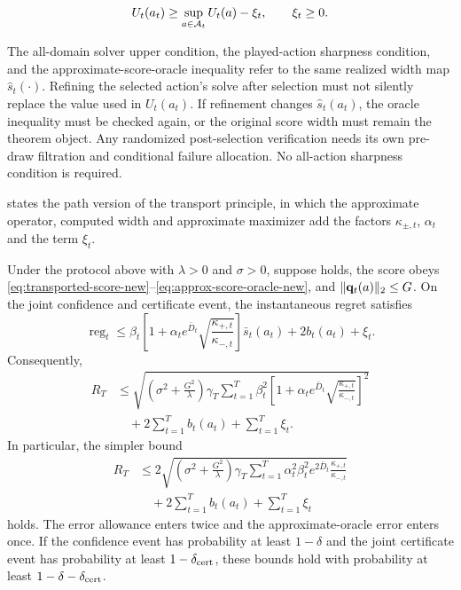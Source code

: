 \begin{equation}\label{eq:approx-score-oracle-new}
 U_t(a_t)\ge\sup_{a\in\mathcal{A}_t}U_t(a)-\xi_t,\qquad \xi_t\ge0.
\end{equation}

\begin{remark}
The all-domain solver upper condition, the played-action sharpness condition,
and the approximate-score-oracle inequality refer to the same realized width
map $\hat s_t(\cdot)$.  Refining the selected action's solve after selection
must not silently replace the value used in $U_t(a_t)$.  If refinement changes
$\hat s_t(a_t)$, the oracle inequality must be checked again, or the original
score width must remain the theorem object.  Any randomized post-selection
verification needs its own pre-draw filtration and conditional failure
allocation.  No all-action sharpness condition is required.
\end{remark}

 states the path version of the transport
principle, in which the approximate operator, computed width and approximate
maximizer add the factors $\kappa_{\pm,t}$, $\alpha_t$ and the term $\xi_t$.

\begin{theorem}
\label{thm:transported-ucb}
Under the protocol above with $\lambda>0$ and $\sigma>0$, suppose
 holds, the score obeys
\eqref{eq:transported-score-new}--\eqref{eq:approx-score-oracle-new}, and
$\|\mathbf{q}_t(a)\|_2\le G$.  On the joint confidence and certificate event, the
instantaneous regret satisfies
\begin{equation}\label{eq:instantaneous-transport-new}
 \operatorname{reg}_t\le
 \beta_t\!\left[1+\alpha_t e^{\bar D_t}
 \sqrt{\frac{\kappa_{+,t}}{\kappa_{-,t}}}\right]\bar s_t(a_t)
 +2b_t(a_t)+\xi_t.
\end{equation}
Consequently,
\begin{align}
R_T
&\le
\sqrt{\left(\sigma^2+\frac{G^2}{\lambda}\right)\gamma_T
\sum_{t=1}^T\beta_t^2
\left[1+\alpha_t e^{\bar D_t}
\sqrt{\frac{\kappa_{+,t}}{\kappa_{-,t}}}\right]^2}
\nonumber\\[-1mm]
&\quad+2\sum_{t=1}^Tb_t(a_t)+\sum_{t=1}^T\xi_t.\label{eq:sharp-transport-regret-new}
\end{align}
In particular, the simpler bound
\begin{align}
R_T
&\le2\sqrt{\left(\sigma^2+\frac{G^2}{\lambda}\right)\gamma_T
\sum_{t=1}^T\alpha_t^2\beta_t^2e^{2\bar D_t}
\frac{\kappa_{+,t}}{\kappa_{-,t}}}
\nonumber\\[-1mm]
&\quad+2\sum_{t=1}^Tb_t(a_t)+\sum_{t=1}^T\xi_t
\label{eq:simple-transport-regret-new}
\end{align}
holds.  The error allowance enters twice and the approximate-oracle error enters
once.  If the confidence event has probability at least $1-\delta$ and the
joint certificate event has probability at least $1-\delta_{\rm cert}$, these
bounds hold with probability at least $1-\delta-\delta_{\rm cert}$.
\end{theorem}


